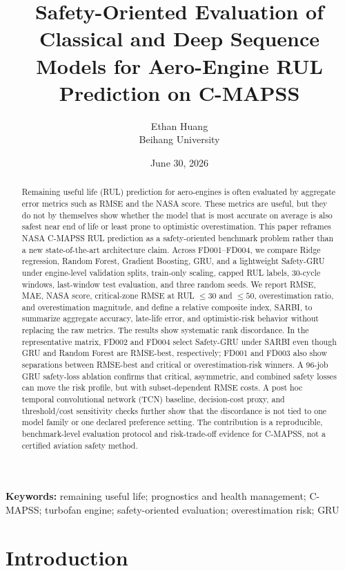 \documentclass[10pt,twocolumn]{article}
\title{\textbf{Safety-Oriented Evaluation of Classical and Deep Sequence Models for Aero-Engine RUL Prediction on C-MAPSS}}
\author{Ethan Huang\\Beihang University}
\date{June 30, 2026}
\begin{document}
\maketitle

\begin{abstract}
Remaining useful life (RUL) prediction for aero-engines is often evaluated by aggregate error metrics such as RMSE and the NASA score. These metrics are useful, but they do not by themselves show whether the model that is most accurate on average is also safest near end of life or least prone to optimistic overestimation. This paper reframes NASA C-MAPSS RUL prediction as a safety-oriented benchmark problem rather than a new state-of-the-art architecture claim. Across FD001--FD004, we compare Ridge regression, Random Forest, Gradient Boosting, GRU, and a lightweight Safety-GRU under engine-level validation splits, train-only scaling, capped RUL labels, 30-cycle windows, last-window test evaluation, and three random seeds. We report RMSE, MAE, NASA score, critical-zone RMSE at RUL $\leq 30$ and $\leq 50$, overestimation ratio, and overestimation magnitude, and define a relative composite index, SARBI, to summarize aggregate accuracy, late-life error, and optimistic-risk behavior without replacing the raw metrics. The results show systematic rank discordance. In the representative matrix, FD002 and FD004 select Safety-GRU under SARBI even though GRU and Random Forest are RMSE-best, respectively; FD001 and FD003 also show separations between RMSE-best and critical or overestimation-risk winners. A 96-job GRU safety-loss ablation confirms that critical, asymmetric, and combined safety losses can move the risk profile, but with subset-dependent RMSE costs. A post hoc temporal convolutional network (TCN) baseline, decision-cost proxy, and threshold/cost sensitivity checks further show that the discordance is not tied to one model family or one declared preference setting. The contribution is a reproducible, benchmark-level evaluation protocol and risk-trade-off evidence for C-MAPSS, not a certified aviation safety method.
\end{abstract}

\noindent\textbf{Keywords:} remaining useful life; prognostics and health management; C-MAPSS; turbofan engine; safety-oriented evaluation; overestimation risk; GRU

\section{Introduction}
\end{document}
